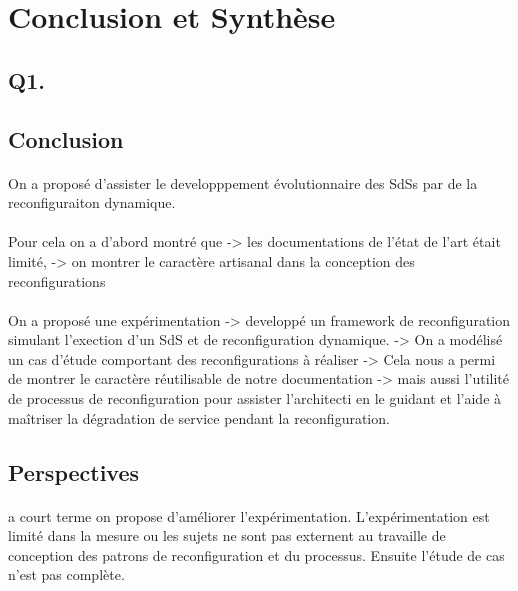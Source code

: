 \section{Conclusion et Synthèse}


\subsection{Q1. }



\subsection{Conclusion}

\paragraph{}
On a proposé d'assister le developppement évolutionnaire des SdSs par
de la reconfiguraiton dynamique. 

\paragraph{}
Pour cela on a d'abord montré que 
-> les documentations de l'état de
l'art était limité, 
-> on montrer le caractère artisanal dans la conception des
reconfigurations 

\paragraph{} 
On a proposé une expérimentation 
-> developpé un framework de reconfiguration simulant l'exection d'un
SdS et de reconfiguration dynamique. 
-> On a modélisé un cas d'étude comportant des reconfigurations à
réaliser
-> Cela nous a permi de montrer le caractère réutilisable de notre
documentation 
-> mais aussi l'utilité de processus de reconfiguration  pour assister
l'architecti en le guidant et l'aide à maîtriser la dégradation de
service pendant la reconfiguration.  


\subsection{Perspectives}

\paragraph{} 
a court terme on propose d'améliorer l'expérimentation.
L'expérimentation est limité dans la mesure ou les sujets ne sont pas
externent au travaille de conception des patrons de reconfiguration et
du processus. 
Ensuite l'étude de cas n'est pas complète. 

